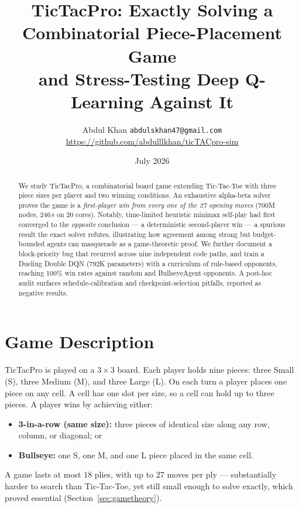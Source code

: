 \documentclass[10pt,twocolumn]{article}
\title{\Large\textbf{TicTacPro: Exactly Solving a Combinatorial Piece-Placement Game\\
and Stress-Testing Deep Q-Learning Against It}}
\author{\normalsize Abdul Khan \quad
\small\texttt{abdulskhan47@gmail.com} \quad
\small\url{https://github.com/abdulllkhan/ticTACpro-sim}}
\date{\vspace{-1.2em}\small July 2026}
\begin{document}
\maketitle
\thispagestyle{empty}

\begin{abstract}
\noindent
We study TicTacPro, a combinatorial board game extending Tic-Tac-Toe with
three piece sizes per player and two winning conditions. An exhaustive
alpha-beta solver proves the game is a \emph{first-player win from every one
of the 27 opening moves} (700M nodes, 246\,s on 20 cores). Notably,
time-limited heuristic minimax self-play had first converged to the
\emph{opposite} conclusion --- a deterministic second-player win --- a
spurious result the exact solver refutes, illustrating how agreement among
strong but budget-bounded agents can masquerade as a game-theoretic proof.
We further document a block-priority bug that recurred across nine
independent code paths, and train a Dueling Double DQN (792K parameters)
with a curriculum of rule-based opponents, reaching 100\% win rates against
random and BullseyeAgent opponents. A post-hoc audit surfaces
schedule-calibration and checkpoint-selection pitfalls, reported as
negative results.
\end{abstract}

\section{Game Description}

TicTacPro is played on a $3\!\times\!3$ board. Each player holds nine pieces:
three Small (S), three Medium (M), and three Large (L). On each turn a player
places one piece on any cell. A cell has one slot per size, so a cell can
hold up to three pieces. A player wins by achieving either:
\begin{itemize}[noitemsep,topsep=2pt,leftmargin=*]
  \item \textbf{3-in-a-row (same size):} three pieces of identical size along
        any row, column, or diagonal; or
  \item \textbf{Bullseye:} one S, one M, and one L piece placed in the same
        cell.
\end{itemize}
A game lasts at most 18 plies, with up to 27 moves per ply --- substantially
harder to search than Tic-Tac-Toe, yet still small enough to solve exactly,
which proved essential (Section~\ref{sec:gametheory}).
\end{document}
